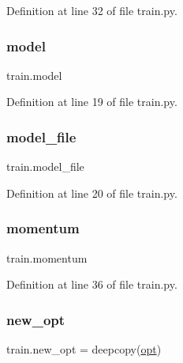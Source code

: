 Definition at line 32 of file train.\+py.

\mbox{\label{namespacetrain_a943b3c8a55b8e52ba14f9b59e14840d2}} 
\subsubsection{\texorpdfstring{model}{model}}
{\footnotesize\ttfamily train.\+model}



Definition at line 19 of file train.\+py.

\mbox{\label{namespacetrain_a1105bc0f8416050a6e26140c97dfe1bf}} 
\subsubsection{\texorpdfstring{model\+\_\+file}{model\_file}}
{\footnotesize\ttfamily train.\+model\+\_\+file}



Definition at line 20 of file train.\+py.

\mbox{\label{namespacetrain_a7e8ea1d3e1d259adf896825c8bdd998c}} 
\subsubsection{\texorpdfstring{momentum}{momentum}}
{\footnotesize\ttfamily train.\+momentum}



Definition at line 36 of file train.\+py.

\mbox{\label{namespacetrain_a251b9c809d918f9575e8fac22c744b56}} 
\subsubsection{\texorpdfstring{new\+\_\+opt}{new\_opt}}
{\footnotesize\ttfamily train.\+new\+\_\+opt = deepcopy(\hyperlink{namespacetrain_a8ce47f3ce85e34ed945573b80e08aaf6}{opt})}



